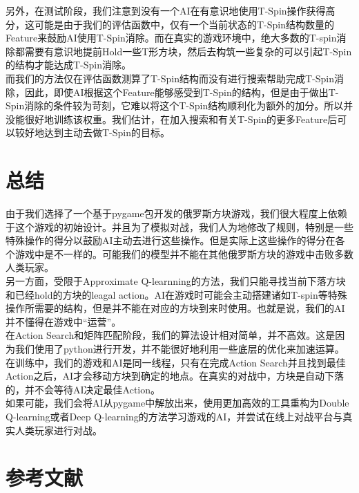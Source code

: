 \documentclass[10pt,UTF8]{article}
\begin{document}
\begin{multicols}{2}

另外，在测试阶段，我们注意到没有一个AI在有意识地使用T-Spin操作获得高分，这可能是由于我们的评估函数中，仅有一个当前状态的T-Spin结构数量的Feature来鼓励AI使用T-Spin消除。而在真实的游戏环境中，绝大多数的T-spin消除都需要有意识地提前Hold一些T形方块，然后去构筑一些复杂的可以引起T-Spin的结构才能达成T-Spin消除。\\
而我们的方法仅在评估函数测算了T-Spin结构而没有进行搜索帮助完成T-Spin消除，因此，即使AI根据这个Feature能够感受到T-Spin的结构，但是由于做出T-Spin消除的条件较为苛刻，它难以将这个T-Spin结构顺利化为额外的加分。所以并没能很好地训练该权重。我们估计，在加入搜索和有关T-Spin的更多Feature后可以较好地达到主动去做T-Spin的目标。

\section{总结}

由于我们选择了一个基于pygame包开发的俄罗斯方块游戏，我们很大程度上依赖于这个游戏的初始设计。并且为了模拟对战，我们人为地修改了规则，特别是一些特殊操作的得分以鼓励AI主动去进行这些操作。但是实际上这些操作的得分在各个游戏中是不一样的。可能我们的模型并不能在其他俄罗斯方块的游戏中击败多数人类玩家。\\

另一方面，受限于Approximate Q-learnning的方法，我们只能寻找当前下落方块和已经hold的方块的leagal action。AI在游戏时可能会主动搭建诸如T-spin等特殊操作所需要的结构，但是并不能在对应的方块到来时使用。也就是说，我们的AI并不懂得在游戏中“运营”。 \\

在Action Search和矩阵匹配阶段，我们的算法设计相对简单，并不高效。这是因为我们使用了python进行开发，并不能很好地利用一些底层的优化来加速运算。\\

在训练中，我们的游戏和AI是同一线程，只有在完成Action Search并且找到最佳Action之后，AI才会移动方块到确定的地点。在真实的对战中，方块是自动下落的，并不会等待AI决定最佳Action。\\

如果可能，我们会将AI从pygame中解放出来，使用更加高效的工具重构为Double Q-learning或者Deep Q-learning的方法学习游戏的AI，并尝试在线上对战平台与真实人类玩家进行对战。\cite{ref1}

\end{multicols}

\section*{参考文献}
\end{document}
